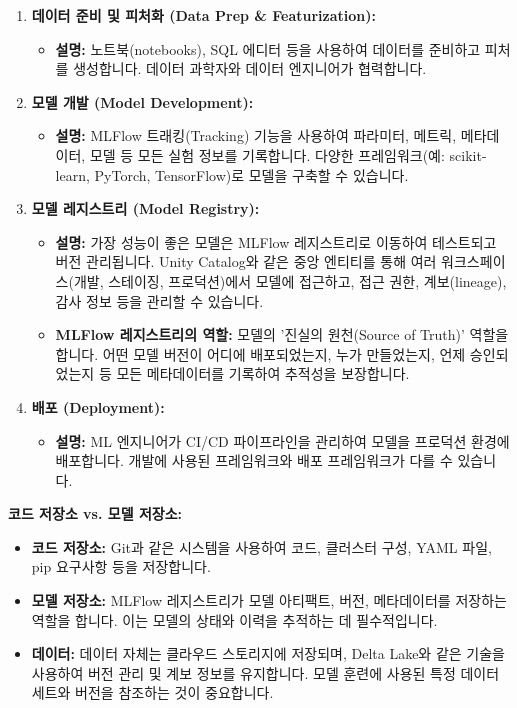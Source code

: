 \documentclass[11pt,a4paper]{article}
\begin{document}
\begin{enumerate}
    \item \textbf{데이터 준비 및 피처화 (Data Prep \& Featurization):}
    \begin{itemize}
        \item \textbf{설명:} 노트북(notebooks), SQL 에디터 등을 사용하여 데이터를 준비하고 피처를 생성합니다. 데이터 과학자와 데이터 엔지니어가 협력합니다.
    \end{itemize}

    \item \textbf{모델 개발 (Model Development):}
    \begin{itemize}
        \item \textbf{설명:} MLFlow 트래킹(Tracking) 기능을 사용하여 파라미터, 메트릭, 메타데이터, 모델 등 모든 실험 정보를 기록합니다. 다양한 프레임워크(예: scikit-learn, PyTorch, TensorFlow)로 모델을 구축할 수 있습니다.
    \end{itemize}

    \item \textbf{모델 레지스트리 (Model Registry):}
    \begin{itemize}
        \item \textbf{설명:} 가장 성능이 좋은 모델은 MLFlow 레지스트리로 이동하여 테스트되고 버전 관리됩니다. Unity Catalog와 같은 중앙 엔티티를 통해 여러 워크스페이스(개발, 스테이징, 프로덕션)에서 모델에 접근하고, 접근 권한, 계보(lineage), 감사 정보 등을 관리할 수 있습니다.
        \item \textbf{MLFlow 레지스트리의 역할:} 모델의 '진실의 원천(Source of Truth)' 역할을 합니다. 어떤 모델 버전이 어디에 배포되었는지, 누가 만들었는지, 언제 승인되었는지 등 모든 메타데이터를 기록하여 추적성을 보장합니다.
    \end{itemize}

    \item \textbf{배포 (Deployment):}
    \begin{itemize}
        \item \textbf{설명:} ML 엔지니어가 CI/CD 파이프라인을 관리하여 모델을 프로덕션 환경에 배포합니다. 개발에 사용된 프레임워크와 배포 프레임워크가 다를 수 있습니다.
    \end{itemize}
\end{enumerate}

\begin{tipbox}
\textbf{코드 저장소 vs. 모델 저장소:}
\begin{itemize}
    \item \textbf{코드 저장소:} Git과 같은 시스템을 사용하여 코드, 클러스터 구성, YAML 파일, pip 요구사항 등을 저장합니다.
    \item \textbf{모델 저장소:} MLFlow 레지스트리가 모델 아티팩트, 버전, 메타데이터를 저장하는 역할을 합니다. 이는 모델의 상태와 이력을 추적하는 데 필수적입니다.
    \item \textbf{데이터:} 데이터 자체는 클라우드 스토리지에 저장되며, Delta Lake와 같은 기술을 사용하여 버전 관리 및 계보 정보를 유지합니다. 모델 훈련에 사용된 특정 데이터 세트와 버전을 참조하는 것이 중요합니다.
\end{itemize}
\end{tipbox}
\end{document}
